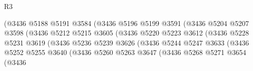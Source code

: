 \begin{lexlean}{R3}
\begin{coremodule}
                                        (@3436
                                          @5188
                                          @5191
                                          @3584
                                          (@3436
                                            @5196
                                            @5199
                                            @3591
                                            (@3436
                                              @5204
                                              @5207
                                              @3598
                                              (@3436
                                                @5212
                                                @5215
                                                @3605
                                                (@3436
                                                  @5220
                                                  @5223
                                                  @3612
                                                  (@3436
                                                    @5228
                                                    @5231
                                                    @3619
                                                    (@3436
                                                      @5236
                                                      @5239
                                                      @3626
                                                      (@3436
                                                        @5244
                                                        @5247
                                                        @3633
                                                        (@3436
                                                          @5252
                                                          @5255
                                                          @3640
                                                          (@3436
                                                            @5260
                                                            @5263
                                                            @3647
                                                            (@3436
                                                              @5268
                                                              @5271
                                                              @3654
                                                              (@3436

\end{coremodule}
\end{lexlean}
